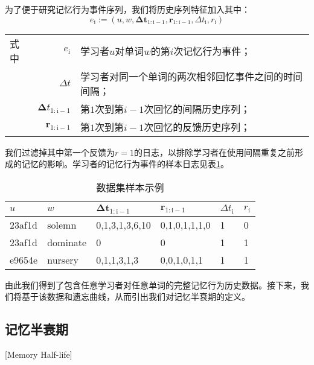 为了便于研究记忆行为事件序列，我们将历史序列特征加入其中：
\begin{equation}
\label{eqn:event}
e_\mathrm{i} :=(u, w, \bm{\Delta t_\mathrm{1:i-1}}, \bm r_\mathrm{1:i-1} , \Delta t_\mathrm{i} , r_\mathrm{i})
\end{equation}
\begin{tabularx}{\textwidth}{@{}l@{\quad}r@{———}X@{}}
    式中& $e_\mathrm{i}$ &学习者$u$对单词$w$的第$i$次记忆行为事件；\\
    &  $\Delta t$ &学习者对同一个单词的两次相邻回忆事件之间的时间间隔；\\
    &  $\bm \Delta t_\mathrm{1:i-1}$ &第$1$次到第$i-1$次回忆的间隔历史序列；\\
    &  $\bm r_\mathrm{1:i-1}$ &第$1$次到第$i-1$次回忆的反馈历史序列；
\end{tabularx}\vspace{3.15bp}

我们过滤掉其中第一个反馈为$r=1$的日志，以排除学习者在使用间隔重复之前形成的记忆的影响。学习者的记忆行为事件的样本日志见表\ref{tab:raw}。

\begin{table}[htbp]
    \caption{数据集样本示例}
    \label{tab:raw}
    \vspace{0.5em}\centering\wuhao
    \begin{tabular}{llllll}
    \toprule[1.5pt]
    $u$    & $w$      & $\bm{\Delta t_\mathrm{1:i-1}}$ & $\bm r_\mathrm{1:i-1}$ & $\Delta t_\mathrm{i}$ & $r_\mathrm{i}$ \\ 
    \midrule[1pt]
    23af1d & solemn   & 0,1,3,1,3,6,10                  & 0,1,0,1,1,1,0           & 1            & 0 \\
    23af1d & dominate & 0                               & 0                       & 1            & 1 \\
    e9654e & nursery  & 0,1,1,3,1,3                     & 0,0,1,0,1,1             & 1            & 1 \\ 
    \bottomrule[1.5pt]
    \end{tabular}
\end{table}

由此我们得到了包含任意学习者对任意单词的完整记忆行为历史数据。接下来，我们将基于该数据和遗忘曲线，从而引出我们对记忆半衰期的定义。

\subsection{记忆半衰期}[Memory Half-life]

